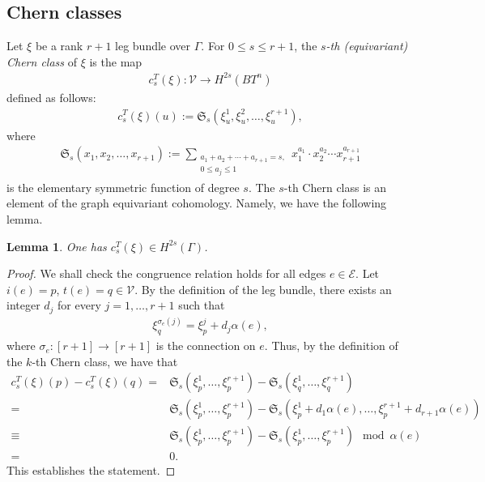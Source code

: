 \documentclass[12pt]{amsart}
\newtheorem{lemma}[theorem]{Lemma}
\theoremstyle{definition}
\theoremstyle{remark}
\numberwithin{equation}{section}
\begin{document}
\subsection{Chern classes}
\label{sect:4.1}
Let $\xi$ be a rank $r+1$ leg bundle over $\Gamma$.
For $0\le s\le r+1$,
the {\it $s$-th (equivariant) Chern class} of $\xi$ is the map
\begin{align*}
c_{s}^{T}(\xi)\colon \mathcal{V}\to H^{2s}(BT^{n})
\end{align*}
defined as follows:
\begin{align*}
c_{s}^{T}(\xi)(u):=\mathfrak{S}_{s}(\xi_{u}^{1},\xi_{u}^{2},\ldots, \xi_{u}^{r+1}),
\end{align*}
where
\begin{align*}
\mathfrak{S}_{s}(x_{1},x_{2},\ldots, x_{r+1}):=\sum_{\substack{a_{1}+a_{2}+\cdots+a_{r+1}=s, \\ 0\le a_{j}\le 1}}x_{1}^{a_{1}}\cdot x_{2}^{a_{2}}\cdots x_{r+1}^{a_{r+1}}
\end{align*}
is the elementary symmetric function of degree $s$.
The $s$-th Chern class is an element of the graph equivariant cohomology.
Namely, we have the following lemma.
\begin{lemma}
\label{Chern_class}
One has
$c_{s}^{T}(\xi)\in H^{2s}(\Gamma)$.
\end{lemma}
\begin{proof}
We shall check the congruence relation holds for all edges $e\in \mathcal{E}$.
Let $i(e)=p$, $t(e)=q\in \mathcal{V}$.
By the definition of the leg bundle, there exists an integer $d_{j}$ for every $j=1,\ldots, r+1$ such that
\begin{align*}
\xi_{q}^{\sigma_{e}(j)}=\xi_{p}^{j}+d_{j}\alpha(e),
\end{align*}
where $\sigma_{e}:[r+1]\to [r+1]$ is the connection on $e$.
Thus, by the definition of the $k$-th Chern class, we have that
\begin{align*}
c_{s}^{T}(\xi)(p)-c_{s}^{T}(\xi)(q)=&\mathfrak{S}_{s}(\xi_{p}^{1},\ldots, \xi_{p}^{r+1})-\mathfrak{S}_{s}(\xi_{q}^{1},\ldots, \xi_{q}^{r+1}) \\
=&\mathfrak{S}_{s}(\xi_{p}^{1},\ldots, \xi_{p}^{r+1})-\mathfrak{S}_{s}(\xi_{p}^{1}+d_{1}\alpha(e),\ldots, \xi_{p}^{r+1}+d_{r+1}\alpha(e)) \\
\equiv & \mathfrak{S}_{s}(\xi_{p}^{1},\ldots, \xi_{p}^{r+1})-\mathfrak{S}_{s}(\xi_{p}^{1},\ldots, \xi_{p}^{r+1}) \mod \alpha(e) \\
= & 0.
\end{align*}
This establishes the statement.
\end{proof}
\end{document}
